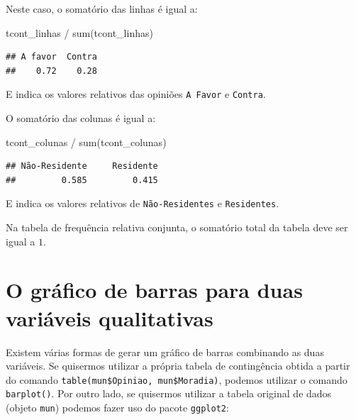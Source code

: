 \documentclass[
]{book}
\newenvironment{Shaded}{\begin{snugshade}}{\end{snugshade}}
\newcommand{\FunctionTok}[1]{\textcolor[rgb]{0.00,0.00,0.00}{#1}}
\newcommand{\NormalTok}[1]{#1}
\newcommand{\SpecialCharTok}[1]{\textcolor[rgb]{0.00,0.00,0.00}{#1}}
\begin{document}
Neste caso, o somatório das linhas é igual a:

\begin{Shaded}
\begin{Highlighting}[]
\NormalTok{tcont\_linhas }\SpecialCharTok{/} \FunctionTok{sum}\NormalTok{(tcont\_linhas)}
\end{Highlighting}
\end{Shaded}

\begin{verbatim}
## A favor  Contra 
##    0.72    0.28
\end{verbatim}

E indica os valores relativos das opiniões \texttt{A\ Favor} e \texttt{Contra}.

O somatório das colunas é igual a:

\begin{Shaded}
\begin{Highlighting}[]
\NormalTok{tcont\_colunas }\SpecialCharTok{/} \FunctionTok{sum}\NormalTok{(tcont\_colunas)}
\end{Highlighting}
\end{Shaded}

\begin{verbatim}
## Não-Residente     Residente 
##         0.585         0.415
\end{verbatim}

E indica os valores relativos de \texttt{Não-Residentes} e \texttt{Residentes}.

Na tabela de frequência relativa conjunta, o somatório total da tabela deve ser igual a \(1\).

\hypertarget{o-gruxe1fico-de-barras-para-duas-variuxe1veis-qualitativas}{%
\section{O gráfico de barras para duas variáveis qualitativas}\label{o-gruxe1fico-de-barras-para-duas-variuxe1veis-qualitativas}}

Existem várias formas de gerar um gráfico de barras combinando as duas variáveis. Se quisermos utilizar a própria tabela de contingência obtida a partir do comando \texttt{table(mun\$Opiniao,\ mun\$Moradia)}, podemos utilizar o comando \texttt{barplot()}. Por outro lado, se quisermos utilizar a tabela original de dados (objeto \texttt{mun}) podemos fazer uso do pacote \texttt{ggplot2}:
\end{document}
